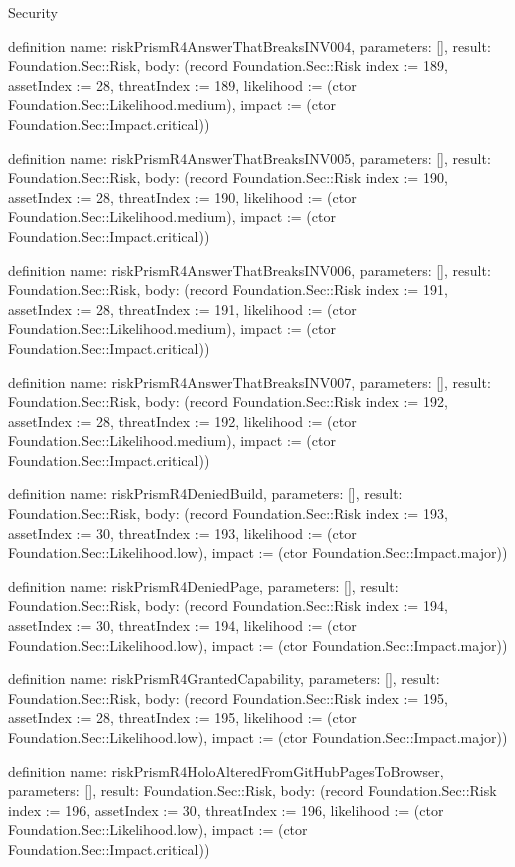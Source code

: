 \begin{lexlean}{Security}
\begin{semanticmodule}
definition{
  name: riskPrismR4AnswerThatBreaksINV004,
  parameters: [],
  result: Foundation.Sec::Risk,
  body: (record Foundation.Sec::Risk {index := 189, assetIndex := 28, threatIndex := 189, likelihood := (ctor Foundation.Sec::Likelihood.medium), impact := (ctor Foundation.Sec::Impact.critical)})
}

definition{
  name: riskPrismR4AnswerThatBreaksINV005,
  parameters: [],
  result: Foundation.Sec::Risk,
  body: (record Foundation.Sec::Risk {index := 190, assetIndex := 28, threatIndex := 190, likelihood := (ctor Foundation.Sec::Likelihood.medium), impact := (ctor Foundation.Sec::Impact.critical)})
}

definition{
  name: riskPrismR4AnswerThatBreaksINV006,
  parameters: [],
  result: Foundation.Sec::Risk,
  body: (record Foundation.Sec::Risk {index := 191, assetIndex := 28, threatIndex := 191, likelihood := (ctor Foundation.Sec::Likelihood.medium), impact := (ctor Foundation.Sec::Impact.critical)})
}

definition{
  name: riskPrismR4AnswerThatBreaksINV007,
  parameters: [],
  result: Foundation.Sec::Risk,
  body: (record Foundation.Sec::Risk {index := 192, assetIndex := 28, threatIndex := 192, likelihood := (ctor Foundation.Sec::Likelihood.medium), impact := (ctor Foundation.Sec::Impact.critical)})
}

definition{
  name: riskPrismR4DeniedBuild,
  parameters: [],
  result: Foundation.Sec::Risk,
  body: (record Foundation.Sec::Risk {index := 193, assetIndex := 30, threatIndex := 193, likelihood := (ctor Foundation.Sec::Likelihood.low), impact := (ctor Foundation.Sec::Impact.major)})
}

definition{
  name: riskPrismR4DeniedPage,
  parameters: [],
  result: Foundation.Sec::Risk,
  body: (record Foundation.Sec::Risk {index := 194, assetIndex := 30, threatIndex := 194, likelihood := (ctor Foundation.Sec::Likelihood.low), impact := (ctor Foundation.Sec::Impact.major)})
}

definition{
  name: riskPrismR4GrantedCapability,
  parameters: [],
  result: Foundation.Sec::Risk,
  body: (record Foundation.Sec::Risk {index := 195, assetIndex := 28, threatIndex := 195, likelihood := (ctor Foundation.Sec::Likelihood.low), impact := (ctor Foundation.Sec::Impact.major)})
}

definition{
  name: riskPrismR4HoloAlteredFromGitHubPagesToBrowser,
  parameters: [],
  result: Foundation.Sec::Risk,
  body: (record Foundation.Sec::Risk {index := 196, assetIndex := 30, threatIndex := 196, likelihood := (ctor Foundation.Sec::Likelihood.low), impact := (ctor Foundation.Sec::Impact.critical)})
}


\end{semanticmodule}
\end{lexlean}
